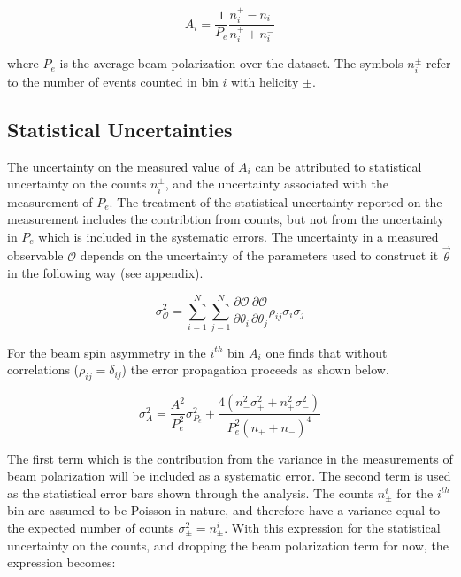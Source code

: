 \begin{equation}
  A_i = \frac{1}{P_e} \frac{n_i^+ - n_i^-}{n_i^+ + n_i^-}
\end{equation}

where $P_e$ is the average beam polarization over the dataset.  The symbols $n_{i}^{\pm}$ refer to the number of events counted in bin $i$ with helicity $\pm$.  


\subsection*{Statistical Uncertainties}
The uncertainty on the measured value of $A_i$ can be attributed to statistical uncertainty on the counts $n_{i}^{\pm}$, and the uncertainty associated with the measurement of $P_e$.  The treatment of the statistical uncertainty reported on the measurement includes the contribtion from counts, but not from the uncertainty in $P_e$ which is included in the systematic errors.  The uncertainty in a measured observable $\mathcal{O}$ depends on the uncertainty of the parameters used to construct it $\vec{\theta}$ in the following way (see appendix).

\begin{equation}
  \label{eqn:error-propagation}
  \sigma_{\mathcal{O}}^2 = \sum_{i=1}^{N} \sum_{j=1}^{N} \frac{\partial \mathcal{O}}{\partial \theta_i} \frac{\partial \mathcal{O}}{\partial \theta_j} \rho_{ij} \sigma_i \sigma_j 
\end{equation}
  
For the beam spin asymmetry in the $i^{th}$ bin $A_i$ one finds that without correlations ($\rho_{ij} = \delta_{ij}$) the error propagation proceeds as shown below.

\begin{equation}
  \sigma_{A}^{2} = \frac{A^2}{P_{e}^2} \sigma_{P_{e}}^{2} + \frac{4 (n_{-}^{2} \sigma_{+}^{2}  + n_{+}^{2} \sigma_{-}^{2})}{ P_{e}^{2} (n_{+} + n_{-})^4}
\end{equation} 

The first term which is the contribution from the variance in the measurements of beam polarization will be included as a systematic error.  The second term is used as the statistical error bars shown through the analysis.  The counts $n_{\pm}^{i}$ for the $i^{th}$ bin are assumed to be Poisson in nature, and therefore have a variance equal to the expected number of counts $\sigma_{\pm}^{2} = n_{\pm}^{i}$.  With this expression for the statistical uncertainty on the counts, and dropping the beam polarization term for now, the expression becomes: 


